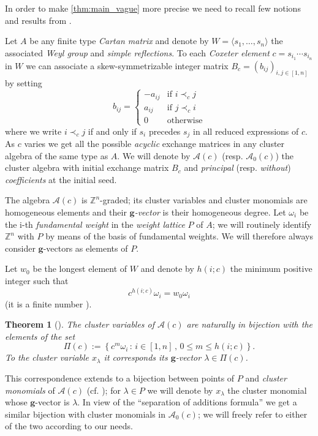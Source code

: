\documentclass[11pt]{amsart}
\newcommand{\cA}{\mathcal{A}}
\newcommand{\ZZ}{\mathbb{Z}}
\newcommand{\bg}{\mathbf{g}}
\newtheorem{theorem}{Theorem}[section]
\numberwithin{equation}{section}
\begin{document}
  In order to make \cref{thm:main_vague} more precise we need to recall few notions and results from \cite{Ste13,YZ08}.

  Let $A$ be any finite type \emph{Cartan matrix} and denote by $W=\langle s_1,\dots,s_n\rangle$ the associated \emph{Weyl group} and \emph{simple reflections}.
  To each \emph{Coxeter element} $c=s_{i_1}\cdots s_{i_n}$ in $W$ we can associate a skew-symmetrizable integer matrix $B_c=(b_{ij})_{i,j\in[1,n]}$ by setting
  \[
    b_{ij}=
    \begin{cases}
      -a_{ij} & \text{if } i\prec_c j  \\
      a_{ij}  & \text{if } j\prec_c i  \\
      0       & \text{otherwise}
    \end{cases}
  \]
  where we write $i\prec_c j$ if and only if $s_i$ precedes $s_j$ in all reduced expressions of $c$.
  As $c$ varies we get all the possible \emph{acyclic} exchange matrices in any cluster algebra of the same type as $A$.
  We will denote by $\cA(c)$ (resp. $\cA_0(c)$) the cluster algebra with initial exchange matrix $B_c$ and  \emph{principal} (resp. \emph{without}) \emph{coefficients} at the initial seed.

  The algebra $\cA(c)$ is $\ZZ^n$-graded; its cluster variables and cluster monomials are homogeneous elements and their \emph{$\bg$-vector} is their homogeneous degree.
  Let $\omega_i$ be the i-th \emph{fundamental weight} in the \emph{weight lattice} $P$ of $A$; we will routinely identify $\ZZ^n$ with $P$ by means of the basis of fundamental weights.
  We will therefore always consider $\bg$-vectors as elements of $P$.

  Let $w_0$ be the longest element of $W$ and denote by $h(i;c)$ the minimum positive integer such that 
  \[
    c^{h(i;c)}\omega_i = w_0\omega_i
  \]
  (it is a finite number \cite[Proposition 1.3]{YZ08}).
  \begin{theorem}[{\cite[Theorem 1.4]{YZ08}}]
    The cluster variables of $\cA(c)$ are naturally in bijection with the elements of the set
    \[
      \Pi(c)
      :=
      \left\{
        c^m\omega_i \, :\, i\in[1,n] \, , \, 0\leq m \leq h(i;c) 
      \right\}.
    \]
    To the cluster variable $x_\lambda$ it corresponds its $\bg$-vector $\lambda\in\Pi(c)$.
  \end{theorem}
  This correspondence extends to a bijection between points of $P$ and \emph{cluster monomials} of $\cA(c)$ (cf. \cite[Theorem 1.2]{Ste13}); for $\lambda\in P$ we will denote by $x_\lambda$ the cluster monomial whose $\bg$-vector is $\lambda$.
  In view of the ``separation of additions formula'' we get a similar bijection with cluster monomials in $\cA_0(c)$; we will freely refer to either of the two according to our needs.
\end{document}
